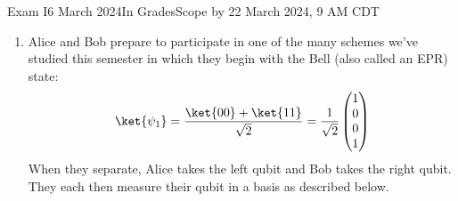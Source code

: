 \documentclass[12pt]{article}
\def\Obox#1{\Ovalbox{\hbox to 1ex{\vrule width 0pt height 1ex\hss #1\hss}}}
\def\TFH{\Obox{\relax}~\textbf{true}~~~\Obox{\relax}~\textbf{false}}
\newcommand{\Blank}[1][1in]{\mbox{\vrule width #1 depth 2pt}\vrule width 0pt height 2.0em}
\begin{document}
\begin{assignment}{Exam I}{6 March 2024}{In GradesScope by 22 March 2024, 9 AM CDT}
\begin{enumerate}
\long{}%
\long\def\GenTableDiff#1#2#3#4{%
\begin{center}
\begin{tabular}{ccc}
Alice & Bob & Possible Outcome? \\
\ensuremath{#1}    & \ensuremath{#3}  & \TFH \\[0.5em]
\ensuremath{#1}    & \ensuremath{#4}  & \TFH \\[0.5em]
\ensuremath{#2}    & \ensuremath{#3}  & \TFH \\[0.5em]
\ensuremath{#2}    & \ensuremath{#4}  & \TFH
\end{tabular}
\end{center}
}
\def\EmptyFour{%
\frac{1}{\Blank[2em]} \begin{pmatrix*}[r]
      \Blank[1.5em] \\
      \Blank[1.5em] \\
      \Blank[1.5em] \\
      \Blank[1.5em]
    \end{pmatrix*}
}
\def\EmptyFourByFour{%
\frac{1}{\Blank[2em]} \begin{pmatrix*}[r]
 \Blank[3em]{} & \Blank[3em]{} & \Blank[3em]{} & \Blank[3em]{} \\
 \Blank[3em]{} & \Blank[3em]{} & \Blank[3em]{} & \Blank[3em]{} \\
 \Blank[3em]{} & \Blank[3em]{} & \Blank[3em]{} & \Blank[3em]{} \\
 \Blank[3em]{} & \Blank[3em]{} & \Blank[3em]{} & \Blank[3em]{}\end{pmatrix*}}
\def\Bell{%
\BellTwo{00}{11}}
\def\BellTwo#1#2{%
\BellTwoSign{#1}{#2}{+}}
\def\BellTwoSign#1#2#3{%
\ensuremath{\frac{\ket{#1} #3 \ket{#2}}{\sqrt{2}}}}
\def\BellM{\BellTwoSign{01}{10}{-}}


\clearpage\item\label{prob:follow} Alice and Bob prepare to participate in one of the
many schemes we've studied this semester in which they begin with the 
Bell (also called an EPR) state:
\[ \ket{\psi_{1}} = \frac{\ket{00}+\ket{11}}{\sqrt{2}} = \frac{1}{\sqrt{2}} \begin{pmatrix} 1\\0\\0\\1\end{pmatrix}\]
When they separate, Alice takes the left qubit and Bob takes the right qubit.
They each then measure their qubit in a basis as described below.


\end{enumerate}
\end{assignment}
\end{document}
